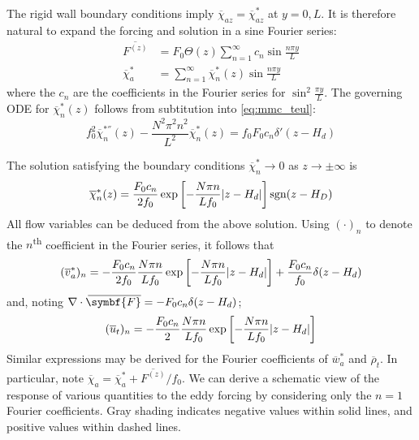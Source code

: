 \documentclass{jknotes}
\newcommand{\myol}[2][3]{{}\mkern#1mu\overline{\mkern-#1mu#2}}
\begin{document}
The rigid wall boundary conditions imply $\overline{\chi}_{az} =
\overline{\chi}_{az}^*$ at $y=0,L$. It is therefore natural to expand the
forcing and solution in a sine Fourier series:
\begin{align}
	\overline{F^{(z)}} &= F_0 \Theta(z) \sum_{n=1}^\infty c_n \sin \frac{n \pi
	y}{L} \\
	\overline{\chi}_a^* &= \sum_{n=1}^\infty \overline{\chi}_n^*(z) \sin
	\frac{n \pi y}{L}
\end{align}
where the $c_n$ are the coefficients in the Fourier series for $\sin^2
\frac{\pi y}{L}$. The governing ODE for
$\overline{\chi}_n^*(z)$ follows from subtitution into \eqref{eq:mmc_teul}:
\begin{equation}
	f_0^2 \overline{\chi}_n^{*''}(z) - \frac{N^2 \pi^2 n^2}{L^2}
	\overline{\chi}_n^*(z) = f_0 F_0 c_n \delta'(z-H_d)
\end{equation}

The solution satisfying the boundary conditions $\overline{\chi}_n^* \to 0$ as
$z \to \pm \infty$ is
\begin{equation}
	\overline{\chi}_n^*(z) = \frac{F_0 c_n}{2f_0} \exp \left[ -\frac{N \pi
	n}{L f_0} \abs{z-H_d}\right] \text{sgn}(z-H_D)
\end{equation}
All flow variables can be deduced from the above solution. Using $(\cdot)_n$
to denote the $n$\textsuperscript{th} coefficient in the Fourier series, it
follows that
\begin{equation}
	(\overline{v}_a^*)_n = -\frac{F_0 c_n}{2f_0} \frac{N \pi n}{L f_0}
	\exp\left[ -\frac{N\pi n}{L f_0} \abs{z-H_d}\right] + \frac{F_0 c_n}{f_0}
	\delta (z-H_d)
\end{equation}
and, noting $\nabla \cdot \myol[4]{\symbf{F}} = -F_0 c_n \delta(z-H_d)$;
\begin{equation}
	(\overline{u}_t)_n = -\frac{F_0c_n}{2} \frac{N \pi n}{L f_0} \exp \left[
	-\frac{N \pi n}{L f_0} \abs{z-H_d}\right]
\end{equation}
Similar expressions may be derived for the Fourier coefficients of
$\overline{w}_a^*$ and $\overline{\rho}_t$. In particular, note
$\overline{\chi}_a = \overline{\chi}_a^* + \overline{F^{(z)}}/f_0$. We can
derive a schematic view of the response of various quantities to the eddy
forcing by considering only the $n=1$ Fourier coefficients. Gray shading
indicates negative values within solid lines, and positive values within
dashed lines.
\end{document}
